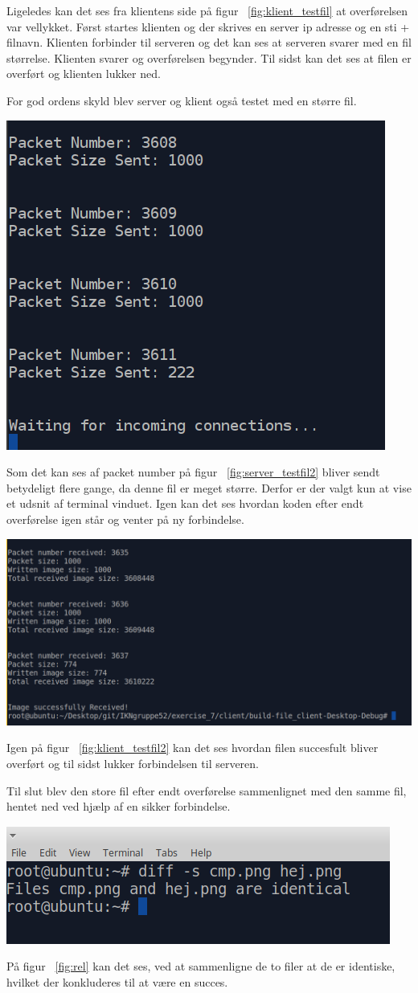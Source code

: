 \documentclass[12pt,fleqn,a4paper]{report}
\begin{document}
Ligeledes kan det ses fra klientens side på figur ~\ref{fig:klient_testfil} at overførelsen var vellykket. 
Først startes klienten og der skrives en server ip adresse og en sti + filnavn. 
Klienten forbinder til serveren og det kan ses at serveren svarer med en fil størrelse. Klienten svarer og overførelsen begynder.
Til sidst kan det ses at filen er overført og klienten lukker ned.


For god ordens skyld blev server og klient også testet med en større fil. 
\begin{center}
	\includegraphics[width=0.3 \textwidth]{server_storfil2.png}
	\label{fig:server_testfil2}
\end{center}

Som det kan ses af packet number på figur  ~\ref{fig:server_testfil2} bliver sendt betydeligt flere gange, da denne fil er meget større. Derfor er der valgt kun at vise et udsnit af terminal vinduet. Igen kan det ses hvordan koden efter endt overførelse igen står og venter på ny forbindelse.

\begin{center}
	\includegraphics[width=0.6 \textwidth]{klient_stortestfil2.png}
	\label{fig:klient_testfil2}
\end{center}

Igen på figur ~\ref{fig:klient_testfil2} kan det ses hvordan filen succesfult bliver overført og til sidst lukker forbindelsen til serveren.
\newpage

Til slut blev den store fil efter endt overførelse sammenlignet med den samme fil, hentet ned ved hjælp af en sikker forbindelse. 
\begin{center}
	\includegraphics[width=0.6 \textwidth]{resultat_er_de_ens.png}
	\label{fig:rel}
\end{center}

På figur ~\ref{fig:rel} kan det ses, ved at sammenligne de to filer at de er identiske, hvilket der konkluderes til at være en succes.
\end{document}
